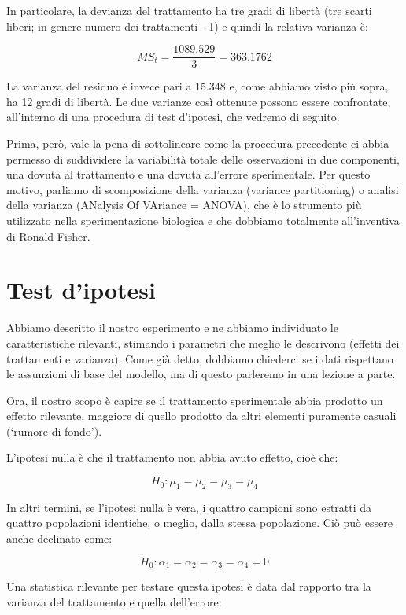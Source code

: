 \documentclass[a4paper,12pt,oneside]{book}
\begin{document}
In particolare, la devianza del trattamento ha tre gradi di libertà (tre scarti liberi; in genere numero dei trattamenti - 1) e quindi la relativa varianza è:

\[MS_t = \frac{1089.529}{3} = 363.1762\]

La varianza del residuo è invece pari a 15.348 e, come abbiamo visto più sopra, ha 12 gradi di libertà. Le due varianze così ottenute possono essere confrontate, all'interno di una procedura di test d'ipotesi, che vedremo di seguito.

Prima, però, vale la pena di sottolineare come la procedura precedente ci abbia permesso di suddividere la variabilità totale delle osservazioni in due componenti, una dovuta al trattamento e una dovuta all'errore sperimentale. Per questo motivo, parliamo di scomposizione della varianza (variance partitioning) o analisi della varianza (ANalysis Of VAriance = ANOVA), che è lo strumento più utilizzato nella sperimentazione biologica e che dobbiamo totalmente all'inventiva di Ronald Fisher.

\hypertarget{test-dipotesi}{%
\section{Test d'ipotesi}\label{test-dipotesi}}

Abbiamo descritto il nostro esperimento e ne abbiamo individuato le caratteristiche rilevanti, stimando i parametri che meglio le descrivono (effetti dei trattamenti e varianza). Come già detto, dobbiamo chiederci se i dati rispettano le assunzioni di base del modello, ma di questo parleremo in una lezione a parte.

Ora, il nostro scopo è capire se il trattamento sperimentale abbia prodotto un effetto rilevante, maggiore di quello prodotto da altri elementi puramente casuali (`rumore di fondo').

L'ipotesi nulla è che il trattamento non abbia avuto effetto, cioè che:

\[H_0: \mu_1 = \mu_2 = \mu_3 = \mu_4\]

In altri termini, se l'ipotesi nulla è vera, i quattro campioni sono estratti da quattro popolazioni identiche, o meglio, dalla stessa popolazione. Ciò può essere anche declinato come:

\[H_0: \alpha_1 = \alpha_2 = \alpha_3 = \alpha_4 = 0\]

Una statistica rilevante per testare questa ipotesi è data dal rapporto tra la varianza del trattamento e quella dell'errore:
\end{document}
